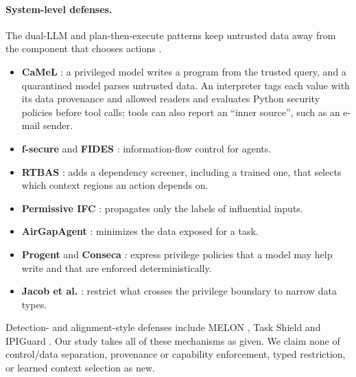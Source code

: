 \documentclass{article}
\begin{document}
\paragraph{System-level defenses.}
The dual-LLM and plan-then-execute patterns keep untrusted data away from the
component that chooses actions \citep{beurerkellner2025design}.
\begin{itemize}
\item \textbf{CaMeL} \citep{debenedetti2025camel}: a privileged model writes
a program from the trusted query, and a quarantined model parses untrusted
data. An interpreter tags each value with its data provenance and allowed
readers and evaluates Python security policies before tool calls; tools can
also report an ``inner source'', such as an e-mail sender.
\item \textbf{f-secure} \citep{wu2024fsecure} and \textbf{FIDES}
\citep{costa2025fides}: information-flow control for agents.
\item \textbf{RTBAS} \citep{zhong2025rtbas}: adds a dependency screener,
including a trained one, that selects which context regions an action
depends on.
\item \textbf{Permissive IFC} \citep{siddiqui2024permissive}: propagates only
the labels of influential inputs.
\item \textbf{AirGapAgent} \citep{bagdasarian2024airgap}: minimizes the data
exposed for a task.
\item \textbf{Progent} \citep{shi2025progent} and \textbf{Conseca}
\citep{tsai2025conseca}: express privilege policies that a model may help
write and that are enforced deterministically.
\item \textbf{Jacob et al.} \citep{jacob2025typed}: restrict what crosses the
privilege boundary to narrow data types.
\end{itemize}
Detection- and alignment-style defenses include MELON
\citep{zhu2025melon}, Task Shield \citep{jia2024taskshield} and IPIGuard
\citep{an2025ipiguard}. Our study takes all of these mechanisms as given. We
claim none of control/data separation, provenance or capability enforcement,
typed restriction, or learned context selection as new.
\end{document}

